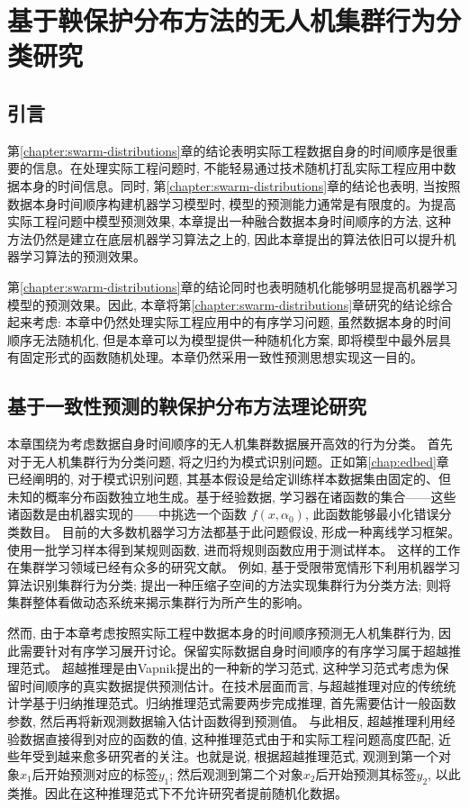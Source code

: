 \chapter{基于鞅保护分布方法的无人机集群行为分类研究}
\label{chapter:swarm-martingales}
\section{引言}
第\ref{chapter:swarm-distributions}章的结论表明实际工程数据自身的时间顺序是很重要的信息。在处理实际工程问题时, 不能轻易通过技术随机打乱实际工程应用中数据本身的时间信息。同时, 第\ref{chapter:swarm-distributions}章的结论也表明, 当按照数据本身时间顺序构建机器学习模型时, 模型的预测能力通常是有限度的。为提高实际工程问题中模型预测效果, 本章提出一种融合数据本身时间顺序的方法, 这种方法仍然是建立在底层机器学习算法之上的, 因此本章提出的算法依旧可以提升机器学习算法的预测效果。

第\ref{chapter:swarm-distributions}章的结论同时也表明随机化能够明显提高机器学习模型的预测效果。因此, 本章将第\ref{chapter:swarm-distributions}章研究的结论综合起来考虑: 本章中仍然处理实际工程应用中的有序学习问题, 虽然数据本身的时间顺序无法随机化, 但是本章可以为模型提供一种随机化方案, 即将模型中最外层具有固定形式的函数随机处理。本章仍然采用一致性预测思想实现这一目的。

\section{基于一致性预测的鞅保护分布方法理论研究}
\label{transductive}

本章围绕为考虑数据自身时间顺序的无人机集群数据展开高效的行为分类。 首先对于无人机集群行为分类问题, 将之归约为模式识别问题。正如第\ref{chap:edbed}章已经阐明的, 对于模式识别问题, 其基本假设是给定训练样本数据集由固定的、但未知的概率分布函数独立地生成。基于经验数据, 学习器在诸函数的集合——这些诸函数是由机器实现的——中挑选一个函数 $f(x, \alpha_{0})$, 此函数能够最小化错误分类数目。 目前的大多数机器学习方法都基于此问题假设, 形成一种离线学习框架。 使用一批学习样本得到某规则函数, 进而将规则函数应用于测试样本。 这样的工作在集群学习领域已经有众多的研究文献。 例如, \citet{Brown2014} 基于受限带宽情形下利用机器学习算法识别集群行为分类; \citet{Berger2016}提出一种压缩子空间的方法实现集群行为分类方法; \citet{Thomas2021}则将集群整体看做动态系统来揭示集群行为所产生的影响。

然而, 由于本章考虑按照实际工程中数据本身的时间顺序预测无人机集群行为, 因此需要针对有序学习展开讨论。保留实际数据自身时间顺序的有序学习属于超越推理范式\citep{vapnik1995,vapnik1998}。 超越推理是由Vapnik提出的一种新的学习范式, 这种学习范式考虑为保留时间顺序的真实数据提供预测估计。在技术层面而言, 与超越推理对应的传统统计学基于归纳推理范式。归纳推理范式需要两步完成推理, 首先需要估计一般函数参数, 然后再将新观测数据输入估计函数得到预测值\citep{Fisher1956}。 与此相反, 超越推理利用经验数据直接得到对应的函数的值, 这种推理范式由于和实际工程问题高度匹配, 近些年受到越来愈多研究者的关注\citep{Becker2014,Luc2014}。也就是说, 根据超越推理范式, 观测到第一个对象$x_{1}$后开始预测对应的标签$y_{1}$; 然后观测到第二个对象$x_{2}$后开始预测其标签$y_{2}$, 以此类推。因此在这种推理范式下不允许研究者提前随机化数据。

